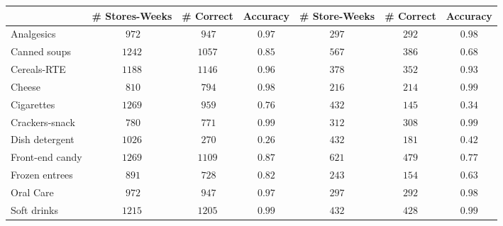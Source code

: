 {\small
\begin{center}
\begin{tabular}{lcccccc}
\hline\hline
\multicolumn{1}{l}{ }&\multicolumn{1}{c}{\# Stores-Weeks}&\multicolumn{1}{c}{\# Correct}&\multicolumn{1}{c}{Accuracy}&\multicolumn{1}{c}{\# Store-Weeks}&\multicolumn{1}{c}{\# Correct}&\multicolumn{1}{c}{Accuracy}\tabularnewline
\hline
Analgesics&$~972$&$~947$&$0.97$&$297$&$292$&$0.98$\tabularnewline
Canned soups&$1242$&$1057$&$0.85$&$567$&$386$&$0.68$\tabularnewline
Cereals-RTE&$1188$&$1146$&$0.96$&$378$&$352$&$0.93$\tabularnewline
Cheese&$~810$&$~794$&$0.98$&$216$&$214$&$0.99$\tabularnewline
Cigarettes&$1269$&$~959$&$0.76$&$432$&$145$&$0.34$\tabularnewline
Crackers-snack&$~780$&$~771$&$0.99$&$312$&$308$&$0.99$\tabularnewline
Dish detergent&$1026$&$~270$&$0.26$&$432$&$181$&$0.42$\tabularnewline
Front-end candy&$1269$&$1109$&$0.87$&$621$&$479$&$0.77$\tabularnewline
Frozen entrees&$~891$&$~728$&$0.82$&$243$&$154$&$0.63$\tabularnewline
Oral Care&$~972$&$~947$&$0.97$&$297$&$292$&$0.98$\tabularnewline
Soft drinks&$1215$&$1205$&$0.99$&$432$&$428$&$0.99$\tabularnewline
\hline
\end{tabular}\end{center}}
